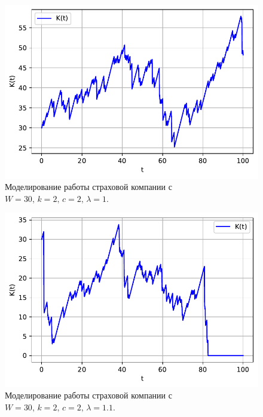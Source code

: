 \documentclass[16pt]{article}
\begin{document}
\begin{figure}
	\center
	\includegraphics[scale=0.7]{11_5.pdf}
	\caption{Моделирование работы страховой компании с $W = 30,\, k = 2,\, c = 2,\, \lambda = 1$.}
\end{figure}

\begin{figure}
	\center
	\includegraphics[scale=0.7]{11_6.pdf}
	\caption{Моделирование работы страховой компании с $W = 30,\, k = 2,\, c = 2,\, \lambda = 1.1$.}
\end{figure}
\end{document}
